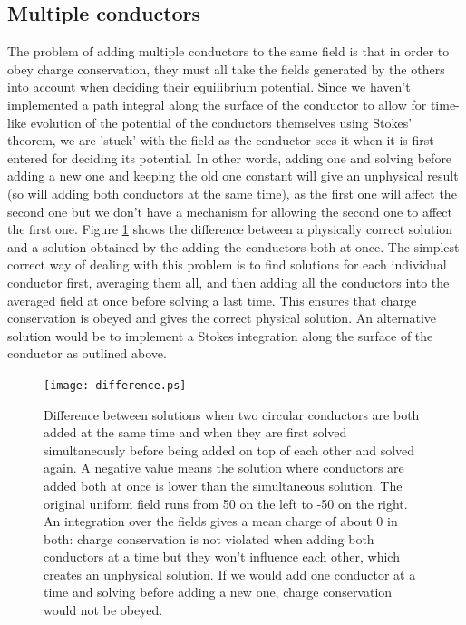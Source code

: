 \documentclass[aps,twocolumn,pre,nofootinbib,10pt]{revtex4-1}
\begin{document}
\subsection{Multiple conductors}
The problem of adding multiple conductors to the same field is that in order to obey charge conservation, they must all take the fields generated by the others into account when deciding their equilibrium potential. Since we haven't implemented a path integral along the surface of the conductor to allow for time-like evolution of the potential of the conductors themselves using Stokes' theorem, we are 'stuck' with the field as the conductor sees it when it is first entered for deciding its potential. In other words, adding one and solving before adding a new one and keeping the old one constant will give an unphysical result (so will adding both conductors at the same time), as the first one will affect the second one but we don't have a mechanism for allowing the second one to affect the first one. Figure \ref{fig:difference} shows the difference between a physically correct solution and a solution obtained by the adding the conductors both at once. The simplest correct way of dealing with this problem is 
to find solutions for each individual conductor 
first, averaging them all, and then adding all the conductors into the averaged field at once before solving a last time. This ensures that charge conservation is obeyed and gives the correct physical solution. An alternative solution would be to implement a Stokes integration along the surface of the conductor as outlined above.

\begin{figure}
\texttt{[image: difference.ps]} 
\caption{Difference between solutions when two circular conductors are both added at the same time and when they are first solved simultaneously before being added on top of each other and solved again. A negative value means the solution where conductors are added both at once is lower than the simultaneous solution. The original uniform field runs from 50 on the left to -50 on the right. An integration over the fields gives a mean charge of about 0 in both: charge conservation is not violated when adding both conductors at a time but they won't influence each other, which creates an unphysical solution. If we would add one conductor at a time and solving before adding a new one, charge conservation would not be obeyed.}
\label{fig:difference}
\end{figure}

\end{document}

